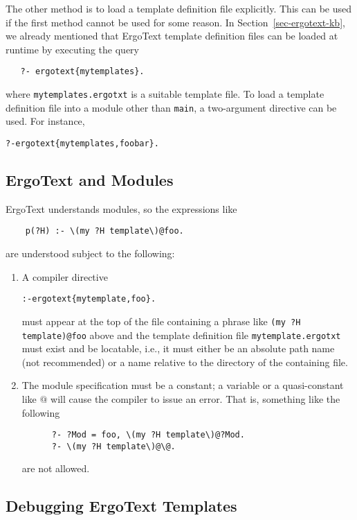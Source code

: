 The other method is to load a template definition file explicitly. This can be used if
the first method cannot be used for some reason.
In Section~\ref{sec-ergotext-kb}, we already mentioned that ErgoText
template definition files can be loaded at runtime by executing the query
\begin{verbatim}
   ?- ergotext{mytemplates}.
\end{verbatim}
where \texttt{mytemplates.ergotxt} is a suitable template file. 
To load a template definition file into a module other than \texttt{main}, a two-argument
directive can be used. For instance,
\begin{alltt}
    ?- ergotext\{mytemplates,foobar\}.
\end{alltt}


\subsection{ErgoText and \ERGO Modules}

ErgoText understands \ERGO modules, so the expressions like
\begin{verbatim}
    p(?H) :- \(my ?H template\)@foo.
\end{verbatim}
are understood subject to the following:
\begin{enumerate}
\item  A compiler directive
\begin{alltt}
    :- ergotext\{mytemplate,foo\}.   
\end{alltt}
  must appear at the top of the file containing a phrase like
  \texttt{\bs(my ?H template\bs)@foo} above and the template definition file
  \texttt{mytemplate.ergotxt} must exist and be locatable, i.e.,
  it must either be an absolute path name (not
  recommended) or a name relative to the directory of the containing file.
\item  The module specification must be a constant;
  a variable or a quasi-constant like \bs$@$ will cause the compiler
  to issue an error. That is, something like the following
\begin{verbatim}
      ?- ?Mod = foo, \(my ?H template\)@?Mod.
      ?- \(my ?H template\)@\@.
\end{verbatim}
  are not allowed.
\end{enumerate}

\subsection{Debugging ErgoText Templates}
\label{sec-ergotext-debug}

